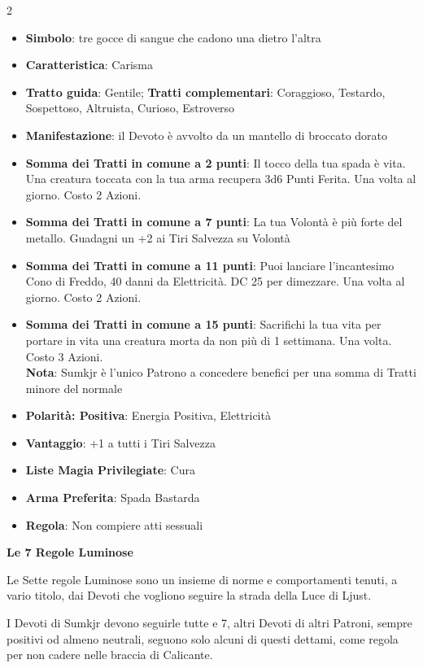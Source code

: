 \begin{multicols}{2}
\begin{itemize}[leftmargin=*] \setlength{\itemsep}{0pt}
\item \textbf{Simbolo}: tre gocce di sangue che cadono una dietro l'altra
\item \textbf{Caratteristica}: Carisma
\item \textbf{Tratto guida}: Gentile; \textbf{Tratti complementari}: Coraggioso, Testardo, Sospettoso, Altruista, Curioso, Estroverso
\item \textbf{Manifestazione}: il Devoto è avvolto da un mantello di broccato dorato
\item \textbf{Somma dei Tratti in comune a 2 punti}: Il tocco della tua spada è vita. Una creatura toccata con la tua arma recupera 3d6 Punti Ferita. Una volta al giorno. Costo 2 Azioni.
\item \textbf{Somma dei Tratti in comune a 7 punti}: La tua Volontà è più forte del metallo. Guadagni un +2 ai Tiri Salvezza su Volontà
\item \textbf{Somma dei Tratti in comune a 11 punti}: Puoi lanciare l'incantesimo Cono di Freddo, 40 danni da Elettricità. DC 25 per dimezzare. Una volta al giorno. Costo 2 Azioni.
\item \textbf{Somma dei Tratti in comune a 15 punti}: Sacrifichi la tua vita per portare in vita una creatura morta da non più di 1 settimana. Una volta. Costo 3 Azioni.\\
\textbf{Nota}: Sumkjr è l'unico Patrono a concedere benefici per una somma di Tratti minore del normale
\item \textbf{Polarità: Positiva}: Energia Positiva, Elettricità
\item \textbf{Vantaggio}: +1 a tutti i Tiri Salvezza
\item \textbf{Liste Magia Privilegiate}: Cura
\item \textbf{Arma Preferita}: Spada Bastarda
\item \textbf{Regola}: Non compiere atti sessuali
\end{itemize}

\textbf{Le 7 Regole Luminose}

Le Sette regole Luminose sono un insieme di norme e comportamenti tenuti, a vario titolo, dai Devoti che vogliono seguire la strada della Luce di Ljust.

I Devoti di Sumkjr devono seguirle tutte e 7, altri Devoti di altri Patroni, sempre positivi od almeno neutrali, seguono solo alcuni di questi dettami, come regola per non cadere nelle braccia di Calicante.


\end{multicols}
